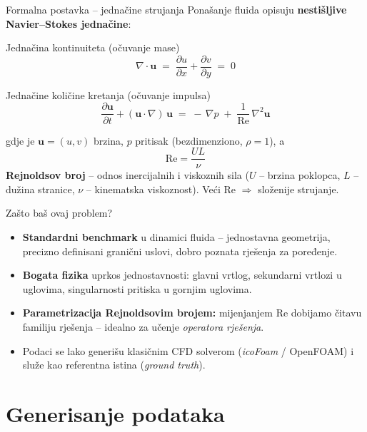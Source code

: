 \documentclass[10pt,aspectratio=169]{beamer}
\begin{document}
\begin{frame}{Formalna postavka -- jednačine strujanja}
  Ponašanje fluida opisuju \textbf{nestišljive Navier--Stokes jednačine}:
  \vfill
  \begin{block}{Jednačina kontinuiteta (očuvanje mase)}
    \[
      \nabla \cdot \mathbf{u} \;=\; \frac{\partial u}{\partial x} + \frac{\partial v}{\partial y} \;=\; 0
    \]
  \end{block}

  \begin{block}{Jednačine količine kretanja (očuvanje impulsa)}
    \[
      \frac{\partial \mathbf{u}}{\partial t}
      + (\mathbf{u}\cdot\nabla)\,\mathbf{u}
      \;=\; -\,\nabla p
      \;+\; \frac{1}{\mathrm{Re}}\,\nabla^{2}\mathbf{u}
    \]
  \end{block}

  \vfill
  \footnotesize
  gdje je $\mathbf{u}=(u,v)$ brzina, $p$ pritisak (bezdimenziono, $\rho=1$), a
  \[
    \mathrm{Re} = \frac{U L}{\nu}
  \]
  \textbf{Rejnoldsov broj} -- odnos inercijalnih i viskoznih sila
  ($U$ -- brzina poklopca, $L$ -- dužina stranice, $\nu$ -- kinematska viskoznost).
  Veći $\mathrm{Re}$ $\Rightarrow$ složenije strujanje.
\end{frame}

\begin{frame}{Zašto baš ovaj problem?}
  \begin{itemize}
    \item \textbf{Standardni benchmark} u dinamici fluida -- jednostavna geometrija,
          precizno definisani granični uslovi, dobro poznata rješenja za poređenje.
    \item \textbf{Bogata fizika} uprkos jednostavnosti: glavni vrtlog, sekundarni
          vrtlozi u uglovima, singularnosti pritiska u gornjim uglovima.
    \item \textbf{Parametrizacija Rejnoldsovim brojem:} mijenjanjem $\mathrm{Re}$
          dobijamo čitavu familiju rješenja -- idealno za učenje \emph{operatora rješenja}.
    \item Podaci se lako generišu klasičnim CFD solverom (\emph{icoFoam} / OpenFOAM)
          i služe kao referentna istina (\emph{ground truth}).
  \end{itemize}
\end{frame}

\section{Generisanje podataka}
\end{document}
